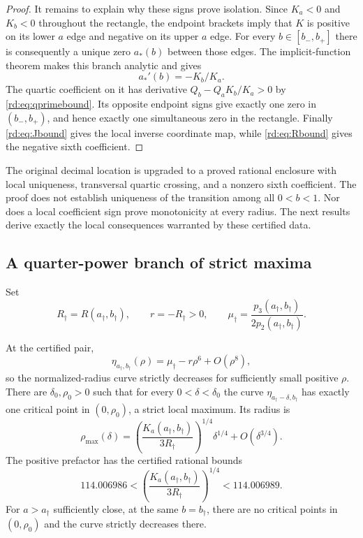 \begin{proof}
It remains to explain why these signs prove isolation. Since $K_a<0$
and $K_b<0$ throughout the rectangle, the endpoint brackets imply that
$K$ is positive on its lower $a$ edge and negative on its upper $a$
edge. For every $b\in[b_-,b_+]$ there is consequently a unique zero
$a_*(b)$ between those edges. The implicit-function theorem makes this
branch analytic and gives
\[
 a_*'(b)=-K_b/K_a.
\]
The quartic coefficient on it has derivative
$Q_b-Q_aK_b/K_a>0$ by \eqref{rd:eq:qprimebound}. Its opposite
endpoint signs give exactly one zero in $(b_-,b_+)$, and hence exactly
one simultaneous zero in the rectangle. Finally
\eqref{rd:eq:Jbound} gives the local inverse coordinate map, while
\eqref{rd:eq:Rbound} gives the negative sixth coefficient.
\end{proof}

\begin{remark}
The original decimal location is upgraded to a proved rational
enclosure with local uniqueness, transversal quartic crossing, and a
nonzero sixth coefficient. The proof does not establish uniqueness of
the transition among all $0<b<1$. Nor does a local coefficient sign
prove monotonicity at every radius. The next results derive exactly the
local consequences warranted by these certified data.
\end{remark}

\subsection{A quarter-power branch of strict maxima}

Set
\[
 R_\dagger=R(a_\dagger,b_\dagger),\qquad
 r=-R_\dagger>0,\qquad
 \mu_\dagger=\frac{p_3(a_\dagger,b_\dagger)}
                   {2p_2(a_\dagger,b_\dagger)}.
\]

\begin{theorem}
\label{rd:thm:quarter}
At the certified pair,
\[
 \eta_{a_\dagger,b_\dagger}(\rho)
   =\mu_\dagger-r\rho^6+O(\rho^8),
\]
so the normalized-radius curve strictly decreases for sufficiently
small positive $\rho$. There are $\delta_0,\rho_0>0$ such that for
every $0<\delta<\delta_0$ the curve
$\eta_{a_\dagger-\delta,b_\dagger}$ has exactly one critical point
in $(0,\rho_0)$, a strict local maximum. Its radius is
\begin{equation}\label{rd:eq:quarter}
 \rho_{\max}(\delta)
 =\left(\frac{K_a(a_\dagger,b_\dagger)}{3R_\dagger}\right)^{1/4}
       \delta^{1/4}+O(\delta^{3/4}).
\end{equation}
The positive prefactor has the certified rational bounds
\[
 114.006986<
 \left(\frac{K_a(a_\dagger,b_\dagger)}{3R_\dagger}\right)^{1/4}
 <114.006989.
\]
For $a>a_\dagger$ sufficiently close, at the same $b=b_\dagger$,
there are no critical points in $(0,\rho_0)$ and the curve strictly
decreases there.
\end{theorem}

